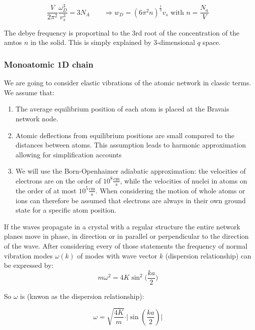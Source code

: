 $$ \frac{V}{2\pi^2} \frac{\omega_D^3}{v_s^3} = 3N_A \qquad \Rightarrow
    w_D = (6\pi^2 n)^{\frac{1}{3}} v_s \textrm{ with } n=\frac{N_a}{V}$$

The debye frequency is proportinal to the 3rd root of the concentration
of the amtos $n$ in the solid. This is simply explained by 3-dimensional 
$q$ space.

\subsubsection*{Monoatomic 1D chain}

We are going to consider elastic vibrations of the atomic network in classic
terms. We assume that:
\begin{enumerate}
\item The average equilibrium position of each atom is placed at the Bravais 
        network node.
\item Atomic deflections from equilibrium positions are small compared to the
        distances between atoms. This assumption leads to harmonic 
        approximation allowing for simplification accounts
\item We will use the Born-Openhaimer adiabatic approximation: the velocities
        of electrons are on the order of $10^8 \mathrm{\frac{cm}{s}}$, while 
        the velocities of nuclei in atoms on the order of at most $10^5 \mathrm
        {\frac{cm}{s}}$. When considering the motion of whole atoms or ions can 
        therefore be assumed that electrons are always in their own
        ground state for a specific atom position.
\end{enumerate}
If the waves propagate in a crystal with a regular structure the entire network planes move in phase, in direction or in parallel or perpendicular to the direction of the wave. After considering every of those statements the frequency of normal vibration modes
$\omega(k)$ of modes with wave vector $k$ (dispersion relationship) can be expressed by:
\begin{equation}
    m\omega^2 = 4K \sin^2\bigg(\frac{ka}{2}\bigg)  
\end{equation}

So $\omega$ is (knwon as the dispersion relationship):

\begin{equation}
    \omega = \sqrt{\frac{4K}{m}}\cdot \vert \sin \left(\frac{ka}{2} \right) \vert
    \label{eq:disp_relation} 
\end{equation}

